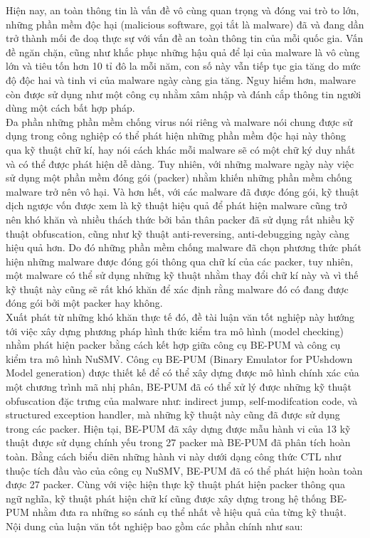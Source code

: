 \setlength\parindent{0pt}
\hspace{0.5cm}Hiện nay, an toàn thông tin là vấn đề vô cùng quan trọng và đóng vai trò to lớn, những phần mềm độc hại (malicious software, gọi tắt là malware) đã và đang dần trở thành mối đe doạ thực sự với vấn đề an toàn thông tin của mỗi quốc gia. Vấn đề ngăn chặn, cũng như khắc phục những hậu quả để lại của malware là vô cùng lớn và tiêu tốn hơn 10 tỉ đô la mỗi năm, con số này vẫn tiếp tục gia tăng do mức độ độc hai và tinh vi của malware ngày càng gia tăng. Nguy hiểm hơn, malware còn được sử dụng như một công cụ nhằm xâm nhập và đánh cắp thông tin người dùng một cách bất hợp pháp.\\  

\hspace{0.5cm}Đa phần những phần mềm chống virus nói riêng và malware nói chung được sử dụng trong công nghiệp có thể phát hiện những phần mềm độc hại này thông qua kỹ thuật chữ kí, hay nói cách khác mỗi malware sẽ có một chữ ký duy nhất và có thể được phát hiện dễ dàng. Tuy nhiên, với những malware ngày này việc sử dụng một phần mềm đóng gói (packer) nhằm khiến những phần mềm chống malware trở nên vô hại. Và hơn hết, với các malware đã được đóng gói, kỹ thuật dịch ngược vốn được xem là kỹ thuật hiệu quả để phát hiện malware cũng trở nên khó khăn và nhiều thách thức bởi bản thân packer đã sử dụng rất nhiều kỹ thuật obfuscation, cũng như kỹ thuật anti-reversing, anti-debugging ngày càng hiệu quả hơn. Do đó những phần mềm chống malware đã chọn phương thức phát hiện những malware được đóng gói thông qua chữ kí của các packer, tuy nhiên, một malware có thể sử dụng những kỹ thuật nhằm thay đổi chữ kí này và vì thế kỹ thuật này cũng sẽ rất khó khăn để xác định rằng malware đó có đang được đóng gói bởi một packer hay không.\\

\hspace{0.5cm}Xuất phát từ những khó khăn thực tế đó, đề tài luận văn tốt nghiệp này hướng tới việc xây dựng phương pháp hình thức kiểm tra mô hình (model checking) nhằm phát hiện packer bằng cách kết hợp giữa công cụ BE-PUM và công cụ kiểm tra mô hình NuSMV. Công cụ BE-PUM (Binary Emulator for PUshdown Model generation) được thiết kế để có thể xây dựng được mô hình chính xác của một chương trình mã nhị phân, BE-PUM đã có thể xử lý được những kỹ thuật obfuscation đặc trưng của malware như: indirect jump, self-modifcation code, và structured exception handler, mà những kỹ thuật này cũng đã được sử dụng trong các packer. Hiện tại, BE-PUM đã xây dựng được mẫu hành vi của 13 kỹ thuật được sử dụng chính yếu trong 27 packer mà BE-PUM đã phân tích hoàn toàn. Bằng cách biểu diẽn những hành vi này dưới dạng công thức CTL như thuộc tích đầu vào của công cụ NuSMV, BE-PUM đã có thể phát hiện hoàn toàn được 27 packer. Cùng với việc hiện thực kỹ thuật phát hiện packer thông qua ngữ nghĩa, kỹ thuật phát hiện chữ kí cũng được xây dựng trong hệ thống BE-PUM nhằm đưa ra những so sánh cụ thể nhất về hiệu quả của từng kỹ thuật.\\

\hspace{0.5cm}Nội dung của luận văn tốt nghiệp bao gồm các phần chính như sau:\\

